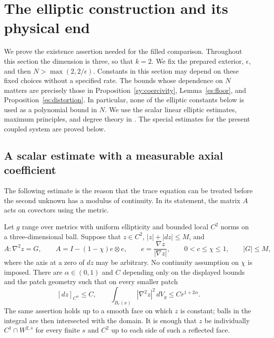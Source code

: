\section{The elliptic construction and its physical end}
\label{so:section}

We prove the existence assertion needed for the filled comparison.  Throughout
this section the dimension is three, so that $k=2$.  We fix the prepared
exterior, $\epsilon$, and then $N>\max(2,2/\epsilon)$.  Constants in this
section may depend on these fixed choices without a specified rate.  The
bounds whose dependence on $N$ matters are precisely those in
Proposition~\ref{sy:coercivity}, Lemma~\ref{es:floor},
and Proposition~\ref{es:distortion}.  In particular, none of the elliptic constants below
is used as a polynomial bound in $N$.
We use the scalar linear elliptic estimates, maximum principles, and
degree theory in \cite[Chapters 6, 8, 9, and 11]{GilbargTrudinger2001}.
The special estimates for the present coupled system are proved below.

\subsection{A scalar estimate with a measurable axial coefficient}

The following estimate is the reason that the trace equation can be treated
before the second unknown has a modulus of continuity.  In its statement,
the matrix $A$ acts on covectors using the metric.

\begin{lemma}\label{so:rough-gradient}
Let $g$ range over metrics with uniform ellipticity and bounded local
$C^2$ norms on a three-dimensional ball.  Suppose that $z\in C^2$,
$|z|+|dz|\le M$, and
\begin{equation}\label{so:axial-equation}
 A:\nabla^2z=G,\qquad
 A=I-(1-\chi)e\otimes e,\qquad
 e=\frac{\nabla z}{|\nabla z|},\qquad
 0<c\le\chi\le1,\qquad |G|\le M,
\end{equation}
where the axis at a zero of $dz$ may be arbitrary.  No continuity assumption
on $\chi$ is imposed.  There are $\alpha\in(0,1)$ and $C$ depending only
on the displayed bounds and the patch geometry such that on every smaller
patch
\begin{equation}\label{so:rough-estimates}
 [dz]_{C^\alpha}\le C,\qquad
 \int_{B_r(x)}|\nabla^2z|^2\,dV_g\le C r^{1+2\alpha}.
\end{equation}
The same assertion holds up to a smooth face on which $z$ is constant;
balls in the integral are then intersected with the domain.  It is enough
that $z$ be individually $C^1\cap W^{2,s}$ for every finite $s$ and
$C^2$ up to each side of such a reflected face.
\end{lemma}


